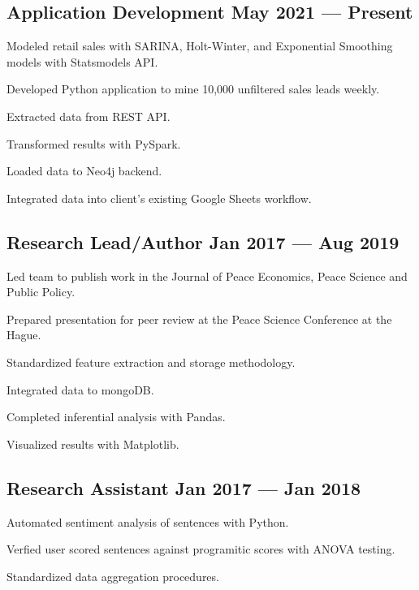 \documentclass[letter,10pt]{article}
\begin{document}
\subsection{{Application Development  \hfill May 2021 --- Present}}
\begin{zitemize}
\item Modeled retail sales with SARINA, Holt-Winter, and Exponential Smoothing models with Statsmodels API.
\item Developed Python application to mine 10,000 unfiltered sales leads weekly.
\item Extracted data from REST API. 
\item Transformed results with PySpark. 
\item Loaded data to Neo4j backend. 
\item Integrated data into client’s existing Google Sheets workflow.
\end{zitemize}

\subsection{{Research Lead/Author  \hfill Jan 2017 --- Aug 2019}}
\begin{zitemize}
\item Led team to publish work in the Journal of Peace Economics, Peace Science and Public Policy.
\item Prepared presentation for peer review at the Peace Science Conference at the Hague. 
\item Standardized feature extraction and storage methodology. 
\item Integrated data to mongoDB.
\item Completed inferential analysis with Pandas.  
\item Visualized results with Matplotlib.
\end{zitemize}

\subsection{{Research Assistant \hfill Jan 2017 --- Jan 2018}}
\begin{zitemize}
\item Automated sentiment analysis of sentences with Python.
\item Verfied user scored sentences against programitic scores with ANOVA testing.
\item Standardized data aggregation procedures.
\end{zitemize}
\end{document}
